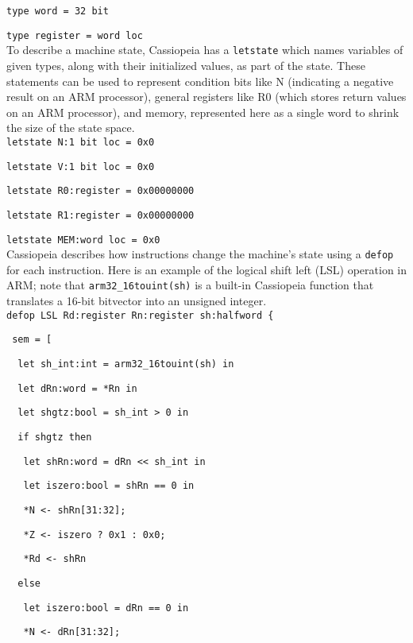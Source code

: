 \documentclass[letterpaper,12pt]{article}
\begin{document}
\texttt{type word = 32 bit}

\texttt{type register = word loc}\\

To describe a machine state, Cassiopeia has a \texttt{letstate} which names variables of given types, along with their initialized values, as part of the state. These statements can be used to represent condition bits like N (indicating a negative result on an ARM processor), general registers like R0 (which stores return values on an ARM processor), and memory, represented here as a single word to shrink the size of the state space.\\

\texttt{letstate N:1 bit loc = 0x0}

\texttt{letstate V:1 bit loc = 0x0}

\texttt{letstate R0:register = 0x00000000}

\texttt{letstate R1:register = 0x00000000}

\texttt{letstate MEM:word loc = 0x0}\\

Cassiopeia describes how instructions change the machine's state using a \texttt{defop} for each instruction.  Here is an example of the logical shift left (LSL) operation in ARM; note that \texttt{arm32\_16touint(sh)} is a built-in Cassiopeia function that translates a 16-bit bitvector into an unsigned integer.\\
        
\texttt{defop LSL Rd:register Rn:register sh:halfword \{}

\texttt{\ sem = [}

\texttt{\ \ let sh\_int:int = arm32\_16touint(sh) in}

\texttt{\ \ let dRn:word = *Rn in}

\texttt{\ \ let shgtz:bool = sh\_int > 0 in}

\texttt{\ \ if shgtz then}

\texttt{\ \ \ let shRn:word = dRn << sh\_int in}

\texttt{\ \ \ let iszero:bool = shRn == 0 in}

\texttt{\ \ \ *N <- shRn[31:32];}

\texttt{\ \ \ *Z <- iszero ? 0x1 : 0x0;}

\texttt{\ \ \ *Rd <- shRn}

\texttt{\ \ else}

\texttt{\ \ \ let iszero:bool = dRn == 0 in}

\texttt{\ \ \ *N <- dRn[31:32];}
\end{document}

